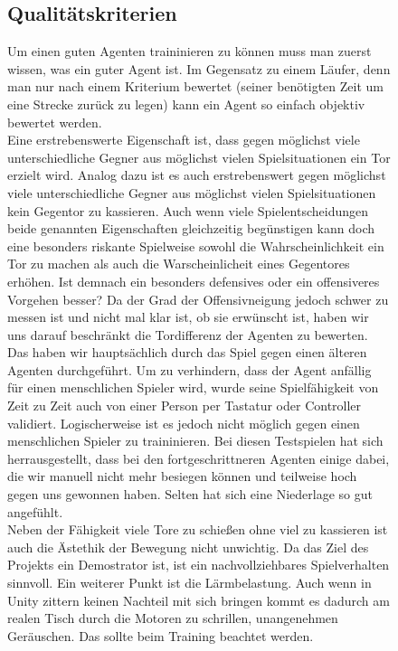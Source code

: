\begin{figure}[h]
\subsection{Qualitätskriterien}
\label{subsect:kriterien}
 
Um einen guten Agenten traininieren zu können muss man zuerst wissen, was ein guter Agent ist. Im Gegensatz zu einem Läufer, denn man nur nach einem Kriterium bewertet (seiner benötigten Zeit um eine Strecke zurück zu legen) kann ein Agent so einfach objektiv bewertet werden. \\
Eine erstrebenswerte Eigenschaft ist, dass gegen möglichst viele unterschiedliche Gegner aus möglichst vielen Spielsituationen ein Tor erzielt wird. Analog dazu ist es auch erstrebenswert gegen möglichst viele unterschiedliche Gegner aus möglichst vielen Spielsituationen kein Gegentor zu kassieren. Auch wenn viele Spielentscheidungen beide genannten Eigenschaften gleichzeitig begünstigen kann doch eine besonders riskante Spielweise sowohl die Wahrscheinlichkeit ein Tor zu machen als auch die Warscheinlicheit eines Gegentores erhöhen. Ist demnach ein besonders defensives oder ein offensiveres Vorgehen besser? Da der Grad der Offensivneigung jedoch schwer zu messen ist und nicht mal klar ist, ob sie erwünscht ist, haben wir uns darauf beschränkt die Tordifferenz der Agenten zu bewerten. Das haben wir hauptsächlich durch das Spiel gegen einen älteren Agenten durchgeführt. Um zu verhindern, dass der Agent anfällig für einen menschlichen Spieler wird, wurde seine Spielfähigkeit von Zeit zu Zeit auch von einer Person per Tastatur oder Controller validiert. Logischerweise ist es jedoch nicht möglich gegen einen menschlichen Spieler zu traininieren. Bei diesen Testspielen hat sich herrausgestellt, dass bei den fortgeschrittneren Agenten einige dabei, die wir manuell nicht mehr besiegen können und teilweise hoch gegen uns gewonnen haben. Selten hat sich eine Niederlage so gut angefühlt. \\
Neben der Fähigkeit viele Tore zu schießen ohne viel zu kassieren ist auch die Ästethik der Bewegung nicht unwichtig. Da das Ziel des Projekts ein Demostrator ist, ist ein nachvollziehbares Spielverhalten sinnvoll. Ein weiterer Punkt ist die Lärmbelastung. Auch wenn in Unity zittern keinen Nachteil mit sich bringen kommt es dadurch am realen Tisch durch die Motoren zu schrillen, unangenehmen Geräuschen. Das sollte beim Training beachtet werden.
\end{figure}

